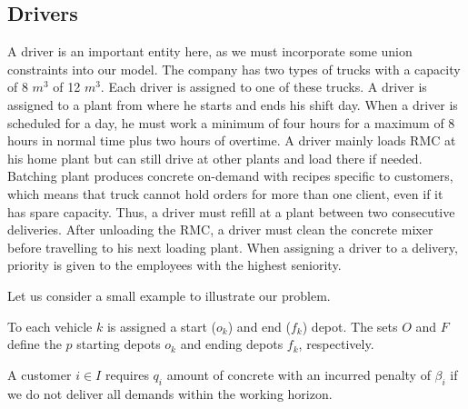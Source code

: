 \documentclass{article}
\begin{document}
{\subsection*{Drivers}  

A driver is an important entity here, as we must incorporate some union constraints into our model. The company has two types of trucks with a capacity of 8 $m^3$ of 12 $m^3$. Each driver is assigned to one of these trucks. A driver is assigned to a plant from where he starts and ends his shift day. When a driver is scheduled for a day, he must work a minimum of four hours for a maximum of 8 hours in normal time plus two hours of overtime. A driver mainly loads RMC at his home plant but can still drive at other plants and load there if needed. Batching plant produces concrete on-demand with recipes specific to customers, which means that truck cannot hold orders for more than one client, even if it has spare capacity. Thus, a driver must refill at a plant between two consecutive deliveries. After unloading the RMC, a driver must clean the concrete mixer before travelling to his next loading plant. When assigning a driver to a delivery, priority is given to the employees with the highest seniority. 

 
Let us consider a small example to illustrate our problem. 
\iffalse


To each vehicle $k$ is assigned a start ($o_k$) and end ($f_k$) depot. The sets $O$ and $F$ define the $p$ starting depots $o_k$ and ending depots $f_k$, respectively.   

A customer $i \in I$ requires $q_i$ amount of concrete with an incurred penalty of $\beta_i$ if we do not deliver all demands within the working horizon. %

}
\end{document}
